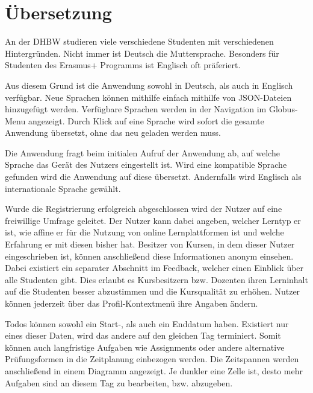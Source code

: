 




\section{Übersetzung}

An der DHBW studieren viele verschiedene Studenten mit verschiedenen Hintergründen.
Nicht immer ist Deutsch die Muttersprache.
Besonders für Studenten des Erasmus+ Programms ist Englisch oft präferiert.

Aus diesem Grund ist die Anwendung sowohl in Deutsch, als auch in Englisch verfügbar.
Neue Sprachen können mithilfe einfach mithilfe von JSON-Dateien hinzugefügt werden.
Verfügbare Sprachen werden in der Navigation im Globus-Menu angezeigt.
Durch Klick auf eine Sprache wird sofort die gesamte Anwendung übersetzt, ohne das neu geladen werden muss.

Die Anwendung fragt beim initialen Aufruf der Anwendung ab, auf welche Sprache das Gerät des Nutzers eingestellt ist.
Wird eine kompatible Sprache gefunden wird die Anwendung auf diese übersetzt.
Andernfalls wird Englisch als internationale Sprache gewählt.





Wurde die Registrierung erfolgreich abgeschlossen wird der Nutzer auf eine freiwillige Umfrage geleitet.
Der Nutzer kann dabei angeben, welcher Lerntyp er ist, wie affine er für die Nutzung von online Lernplattformen ist und welche Erfahrung er mit diesen bisher hat.
Besitzer von Kursen, in dem dieser Nutzer eingeschrieben ist, können anschließend diese Informationen anonym einsehen.
Dabei existiert ein separater Abschnitt im Feedback, welcher einen Einblick über alle Studenten gibt.
Dies erlaubt es Kursbesitzern bzw. Dozenten ihren Lerninhalt auf die Studenten besser abzustimmen und die Kursqualität zu erhöhen.
Nutzer können jederzeit über das Profil-Kontextmenü ihre Angaben ändern.


Todos können sowohl ein Start-, als auch ein Enddatum haben.
Existiert nur eines dieser Daten, wird das andere auf den gleichen Tag terminiert.
Somit können auch langfristige Aufgaben wie Assignments oder andere alternative Prüfungsformen in die Zeitplanung einbezogen werden.
Die Zeitspannen werden anschließend in einem Diagramm angezeigt.
Je dunkler eine Zelle ist, desto mehr Aufgaben sind an diesem Tag zu bearbeiten, bzw. abzugeben.



